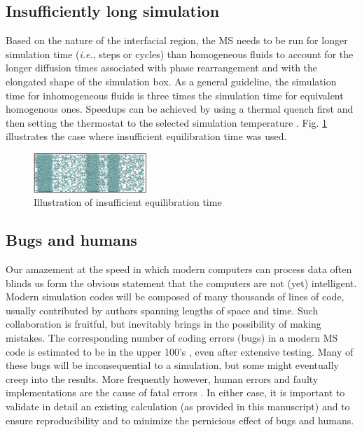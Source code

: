 \documentclass[9pt,bestpractices]{livecoms}
\begin{document}
\subsection{Insufficiently long simulation} 

Based on the nature of the interfacial region, the MS needs to be run for
longer simulation time (\textit{i.e}., steps or cycles) than homogeneous fluids
to account for the longer diffusion times associated with phase rearrangement
and with the elongated shape of the simulation box. As a general guideline, the
simulation time for inhomogeneous fluids is three times the simulation time for
equivalent homogenous ones. Speedups can be achieved by using a thermal quench
first and then setting the thermostat to the selected simulation temperature
\citep{gelb2002}. Fig. \ref{fig:26} illustrates the case where insufficient equilibration time was
used.

\begin{figure}
\includegraphics[width=0.38\textwidth]{gfx/image77.png}
\caption{Illustration of insufficient equilibration time}
\label{fig:26}
\end{figure}

\subsection{Bugs and humans}

Our amazement at the speed in which modern computers can process data often
blinds us form the obvious statement that the computers are not (yet)
intelligent. Modern simulation codes will be composed of many thousands of
lines of code, usually contributed by authors spanning lengths of space and
time. Such collaboration is fruitful, but inevitably brings in the possibility
of making mistakes. The corresponding number of coding errors (bugs) in
a modern MS code is estimated to be in the upper 100's \citep{schappals2017},
even after extensive
testing. Many of these bugs will be inconsequential to a simulation, but some
might eventually creep into the results. More frequently however, human errors
and faulty implementations are the cause of fatal errors
\citep{wong2016}. In either case, it is important to validate in
detail an existing calculation (as provided in this manuscript) and to ensure
reproducibility and to minimize the pernicious effect of bugs and humans.  
\end{document}
